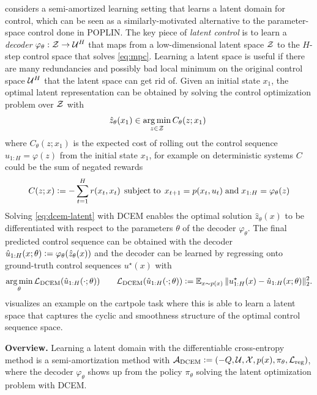 \documentclass[twoside,11pt]{article}
\begin{document}
\citet{amos2019dcem} considers a semi-amortized learning setting
that learns a latent domain for control, which can be seen as
a similarly-motivated alternative to the parameter-space
control done in POPLIN.
The key piece of \emph{latent control}
is to learn a \emph{decoder} $\varphi_\theta:{\mathcal{Z}}\rightarrow {\mathcal{U}}^H$
that maps from a low-dimensional latent space ${\mathcal{Z}}$ to the
$H$-step control space that solves \cref{eq:mpc}.
Learning a latent space is useful if there are many redundancies
and possibly bad local minimum on the original control space
${\mathcal{U}}^H$ that the latent space can get rid of.
Given an initial state $x_1$, the optimal latent representation
can be obtained by solving the control optimization problem
over ${\mathcal{Z}}$ with
\begin{equation}
  \hat z_\theta(x_1)\in \operatorname*{arg\,min}_{z\in{\mathcal{Z}}} C_\theta(z; x_1)\;
  \label{eq:dcem-latent}
\end{equation}
where $C_\theta(z; x_1)$ is the expected cost of rolling out the
control sequence $u_{1:H}=\varphi(z)$ from the initial state
$x_1$, for example on deterministic systems $C$
could be the sum of negated rewards
\begin{equation}
  C(z; x) \vcentcolon= -\sum_{t=1}^H r(x_t, x_t)\;
  \operatorname*{subject\;to}\;x_{t+1}=p(x_t, u_t)\; {\rm and}\; x_{1:H}=\varphi_\theta(z)
  \label{eq:latent-cost}
\end{equation}
Solving \cref{eq:dcem-latent} with DCEM enables the optimal
solution $\hat z_\theta(x)$ to be differentiated with respect
to the parameters $\theta$ of the decoder $\varphi_\theta$.
The final predicted control sequence can be
obtained with the decoder
$\hat u_{1:H}(x; \theta)\vcentcolon= \varphi_\theta(\hat z_\theta(x))$
and the decoder can be learned by regressing
onto ground-truth control sequences $u^\star(x)$ with
\begin{equation}
  \operatorname*{arg\,min}_\theta {\mathcal{L}}_{\rm DCEM}(\hat u_{1:H}(\cdot; \theta)) \qquad {\mathcal{L}}_{\rm DCEM}(\hat u_{1:H}(\cdot; \theta))\vcentcolon= \operatorname{\mathbb{E}}_{x \sim p(x)}
  \|u^\star_{1:H}(x) - \hat u_{1:H}(x; \theta)\|_2^2.
\label{eq:dcem-loss}
\end{equation}
 visualizes an example on the cartpole task
where this is able to learn a latent space that captures the
cyclic and smoothness structure of the optimal control
sequence space.

\textbf{Overview.} Learning a latent domain with the differentiable
cross-entropy method is a semi-amortization method with
${\mathcal{A}}_{\rm DCEM}\vcentcolon= (-Q, {\mathcal{U}}, {\mathcal{X}}, p(x), \pi_\theta, {\mathcal{L}}_{\rm reg})$,
where the decoder $\varphi_\theta$ shows up from
the policy $\pi_\theta$ solving the latent
optimization problem with DCEM.
\end{document}
